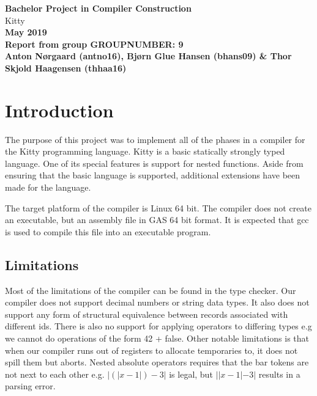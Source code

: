\documentclass{article}
\newcommand{\bigfont}{\usefont{OT1}{cmbig}{m}{n}}
\newcommand{\MyHuge}[1]{{\bigfont\fontsize{2.2cm}{2.42cm}\selectfont #1}}
\begin{document}
\thispagestyle{empty}
\begin{center}
{\LARGE\bf Bachelor Project in Compiler Construction}
\\[15ex]
\MyHuge{Kitty}
\\[15ex]
{\LARGE\bf May 2019}
\\[10ex]
{\Large\bf Report from group GROUPNUMBER: 9 }
\\[2ex]
{\Large\bf Anton Nørgaard (antno16), Bjørn Glue Hansen (bhans09) \& Thor Skjold Haagensen (thhaa16)}
\end{center}

\setcounter{page}{0}
\newpage

\section{Introduction}
The purpose of this project was to implement all of the phases in a compiler for the Kitty programming language. Kitty is a basic statically strongly typed language. One of its special features is support for nested functions. Aside from ensuring that the basic language is supported, additional extensions have been made for the language. 

The target platform of the compiler is Linux 64 bit. The compiler does not create an executable, but an assembly file in GAS 64 bit format. It is expected that gcc is used to compile this file into an executable program. 

\subsection{Limitations}
Most of the limitations of the compiler can be found in the type checker. Our compiler does not support decimal numbers or string data types. It also does not support any form of structural equivalence between records associated with different ids. There is also no support for applying operators to differing types e.g we cannot do operations of the form 42 + false.  Other notable limitations is that when our compiler runs out of registers to allocate temporaries to, it does not spill them but aborts. Nested absolute operators requires that the bar tokens are not next to each other e.g. $|(|x - 1|) - 3|$ is legal, but $||x - 1| - 3|$ results in a parsing error.
\end{document}
